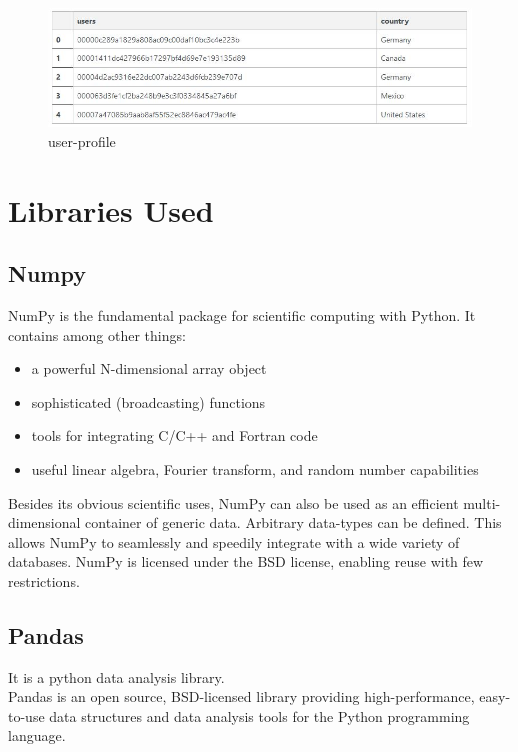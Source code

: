 \documentclass[paper=a4, fontsize=12pt]{scrartcl}
\numberwithin{equation}{section}		%
\numberwithin{figure}{section}			%
\numberwithin{table}{section}				%
\begin{document}
	
\begin{figure}[!b]
  \vspace{2cm}
  \centering  
  \includegraphics[scale=0.7]{user_profile.jpg}
  \caption{user-profile}
  \label{fig:boat1}
\end{figure}

\section{Libraries Used}
\subsection{Numpy}

NumPy is the fundamental package for scientific computing with Python. It contains among other things:
\begin{itemize}	
  \item a powerful N-dimensional array object
  \item sophisticated (broadcasting) functions
  \item tools for integrating C/C++ and Fortran code
  \item useful linear algebra, Fourier transform, and random number capabilities
\end{itemize}

Besides its obvious scientific uses, NumPy can also be used as an efficient multi-dimensional container of generic data. Arbitrary data-types can be defined. This allows NumPy to seamlessly and speedily integrate with a wide variety of databases. NumPy is licensed under the BSD license, enabling reuse with few restrictions.

\subsection{Pandas}

It is a python data analysis library.
\\
Pandas is an open source, BSD-licensed library providing high-performance, easy-to-use data structures and data analysis tools for the Python programming language.
\end{document}
